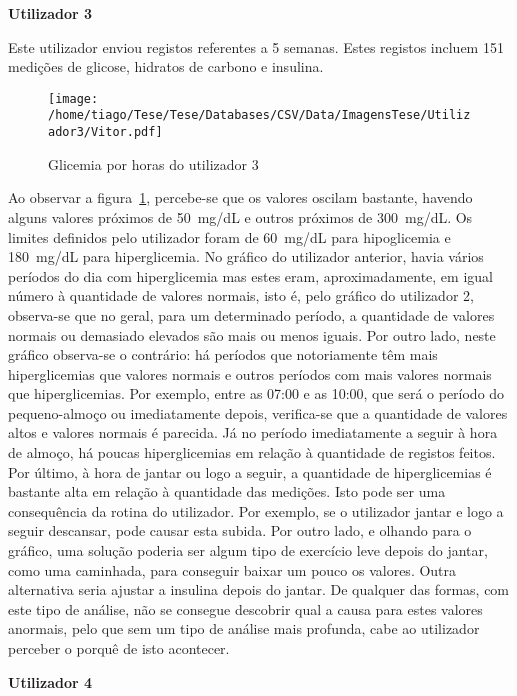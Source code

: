 \textbf{Utilizador 3}

Este utilizador enviou registos referentes a 5 semanas. Estes registos incluem 151 medições de glicose, hidratos de carbono e insulina.
\begin{figure}[H]
\centering
\texttt{[image: /home/tiago/Tese/Tese/Databases/CSV/Data/ImagensTese/Utilizador3/Vitor.pdf]}
\caption{Glicemia por horas do utilizador 3}
\label{fig:uti3}
\end{figure}
Ao observar a figura~\ref{fig:uti3}, percebe-se que os valores oscilam bastante, havendo alguns valores próximos de 50~mg/dL e outros próximos de 300~mg/dL. Os limites definidos pelo utilizador foram de 60~mg/dL para hipoglicemia e 180~mg/dL para hiperglicemia. No gráfico do utilizador anterior, havia vários períodos do dia com hiperglicemia mas estes eram, aproximadamente, em igual número à quantidade de valores normais, isto é, pelo gráfico do utilizador 2, observa-se que no geral, para um determinado período, a quantidade de valores normais ou demasiado elevados são mais ou menos iguais. Por outro lado, neste gráfico observa-se o contrário: há períodos que notoriamente têm mais hiperglicemias que valores normais e outros períodos com mais valores normais que hiperglicemias. 
Por exemplo, entre as 07:00 e as 10:00, que será o período do pequeno-almoço ou imediatamente depois, verifica-se que a quantidade de valores altos e valores normais é parecida. Já no período imediatamente a seguir à hora de almoço, há poucas hiperglicemias em relação à quantidade de registos feitos. Por último, à hora de jantar ou logo a seguir, a quantidade de hiperglicemias é bastante alta em relação à quantidade das medições. Isto pode ser uma consequência da rotina do utilizador. Por exemplo, se o utilizador jantar e logo a seguir descansar, pode causar esta subida. Por outro lado, e olhando para o gráfico, uma solução poderia ser algum tipo de exercício leve depois do jantar, como uma caminhada, para conseguir baixar um pouco os valores. Outra alternativa seria ajustar a insulina depois do jantar. 
De qualquer das formas, com este tipo de análise, não se consegue descobrir qual a causa para estes valores anormais, pelo que sem um tipo de análise mais profunda, cabe ao utilizador perceber o porquê de isto acontecer.



\textbf{Utilizador 4}

